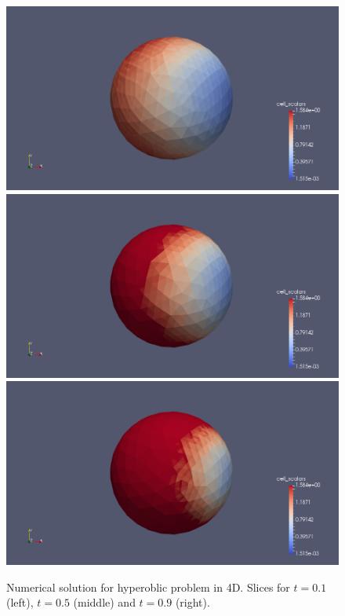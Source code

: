 \documentclass[12pt]{article}
\begin{document}
\begin{figure}[!htb]
  \includegraphics[width=\linewidth]{solution_1.png}
\endminipage\hfill
{}
  \includegraphics[width=\linewidth]{solution_2.png}
\endminipage\hfill
{}
  \includegraphics[width=\linewidth]{solution_3.png}
\endminipage\hfill
\caption{Numerical solution for hyperoblic problem in 4D. Slices for $t = 0.1$ (left), $t = 0.5$ (middle) and $t = 0.9$ (right).}
\end{figure}
\end{document}
